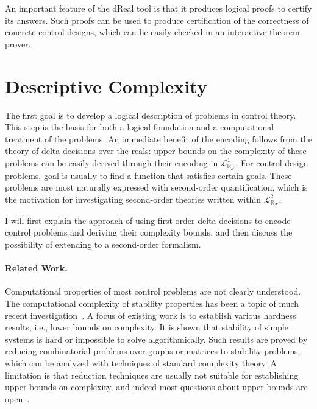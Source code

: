 \documentclass[10pt]{article}
\newcommand{\lrf}{\mathcal{L}_{\mathbb{R}_{\mathcal{F}}}}
\theoremstyle{definition}
\begin{document}
An important feature of the dReal tool is that it produces logical proofs to certify its answers. Such proofs can be used to produce certification of the correctness of concrete control designs, which can be easily checked in an interactive theorem prover. 

\section{Descriptive Complexity}\label{dc}

The first goal is to develop a logical description of problems in control theory. This step is the basis for both a logical foundation and a computational treatment of the problems. An immediate benefit of the encoding follows from the theory of delta-decisions over the reals: upper bounds on the complexity of these problems can be easily derived through their encoding in $\lrf^1$. For control design problems, goal is usually to find a function that satisfies certain goals. These problems are most naturally expressed with second-order quantification, which is the motivation for investigating second-order theories written within $\lrf^2$. 

I will first explain the approach of using first-order delta-decisions to encode control problems and deriving their complexity bounds, and then discuss the possibility of extending to a second-order formalism. 

\paragraph{Related Work.} Computational properties of most control problems are not clearly understood. The computational complexity of stability properties has been a topic of much recent investigation~\cite{DBLP:journals/corr/AhmadiP13,DBLP:journals/automatica/BlondelT99,DBLP:journals/automatica/BlondelT00,AAAthesis,DBLP:conf/hybrid/PrabhakarV13,DBLP:journals/corr/abs-1210-7420}. A focus of existing work is to establish various hardness results, i.e., lower bounds on complexity. It is shown that stability of simple systems is hard or impossible to solve algorithmically. Such results are proved by reducing combinatorial problems over graphs or matrices to stability problems, which can be analyzed with techniques of standard complexity theory. A limitation is that reduction techniques are usually not suitable for establishing upper bounds on complexity, and indeed most questions about upper bounds are open~\cite{AAAthesis}. 
\end{document}
